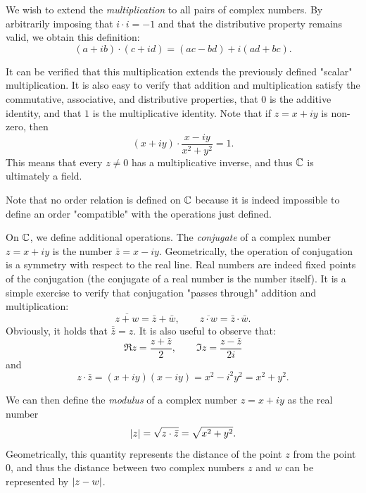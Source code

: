 We wish to extend the \emph{multiplication}%
%
 to all pairs of complex numbers.
By arbitrarily imposing that $i\cdot i = -1$ and that the distributive property
remains valid, we obtain this definition:
\[
   (a+ib) \cdot (c+id) = (ac-bd) + i(ad+bc).
\]

It can be verified that this multiplication extends the previously defined
"scalar" multiplication.
It is also easy to verify that addition and multiplication satisfy the
commutative, associative, and distributive properties, that $0$ is the additive
identity, and that $1$ is the multiplicative identity.
Note that if $z=x+iy$ is non-zero, then
\[
  (x+iy) \cdot \frac{x-iy}{x^2+y^2} = 1.
\]
This means that every $z\neq 0$ has a multiplicative inverse, and thus ${\mathbb C}$ is
ultimately a field.

Note that no order relation is defined on ${\mathbb C}$ because it is indeed impossible
to define an order "compatible" with the operations just defined.%

On ${\mathbb C}$, we define additional operations.
The \emph{conjugate}%
%
%
of a complex number $z=x+iy$ is the number
$\bar z = x - iy$. Geometrically, the operation of conjugation is a symmetry
with respect to the real line. Real numbers are indeed fixed points of the
conjugation (the conjugate of a real number is the number itself).
It is a simple exercise to verify that conjugation "passes through" addition and
multiplication:
\[
\overline{z+w} = \bar z + \bar w, \qquad
\overline{z\cdot w} = \bar z \cdot \bar w.
\]
Obviously, it holds that $\overline {\bar z} = z$.
It is also useful to observe that:
\begin{equation}\label{eq:re_im}
  \Re z = \frac{z+\bar z}{2}, \qquad
  \Im z = \frac{z-\bar z}{2i}
\end{equation}
and
\[
z \cdot \bar z = (x+iy)(x-iy) = x^2-i^2y^2 = x^2+y^2.
\]

We can then define the
\emph{modulus}%
%
%
 of a complex number $z=x+iy$
as the real number
\[
{\left|z\right|} = \sqrt{z\cdot\bar z} = \sqrt{x^2+y^2}.
\]
Geometrically, this quantity represents the distance of the point $z$
from the point $0$, and thus the distance between two complex numbers $z$ and
$w$ can be represented by ${\left|z-w\right|}$.

